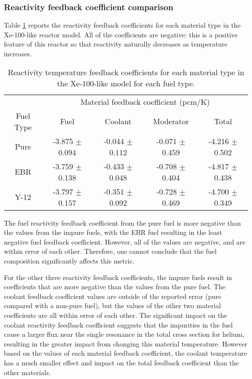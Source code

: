 \subsubsection{Reactivity feedback coefficient comparison}
Table \ref{tab:coeff_xe100} reports the reactivity feedback 
coefficients for each material type in the Xe-100-like reactor model. 
All of the coefficients are negative: this is a positive feature of 
this reactor so that reactivity naturally decreases as temperature 
increases. 

\begin{table}[ht]
        \centering
        \caption{Reactivity temperature feedback coefficients for 
        each material type in the Xe-100-like model for each fuel 
        type.}
        \label{tab:coeff_xe100}
        \begin{tabular}{c c c c c}
            \hline 
            & \multicolumn{4}{c}{Material feedback coefficient (pcm/K)} \\
            Fuel Type & Fuel & Coolant & Moderator & Total \\
            \hline
            Pure & -3.875 $\pm$ 0.094 & -0.044 $\pm$ 0.112 & -0.071 $\pm$ 0.459 & -4.216 $\pm$ 0.502\\
            \gls{EBR} & -3.759 $\pm$ 0.138 & -0.433 $\pm$ 0.048 & -0.708 $\pm$ 0.404 & -4.817 $\pm$ 0.438\\
            Y-12 & -3.797 $\pm$ 0.157 & -0.351 $\pm$ 0.092 & -0.728 $\pm$ 0.469 & -4.700 $\pm$ 0.349\\
            \hline

        \end{tabular}
\end{table}

The fuel reactivity feedback coefficient from the pure fuel is more 
negative than the values from the impure fuels, with the \gls{EBR} fuel 
resulting in the least negative fuel feedback coefficient. However, all of 
the values are negative, and are within error of each other. Therefore, 
one cannot conclude that the fuel composition significantly affects this 
metric. 

For the other three reactivity feedback coefficients, the impure fuels 
result in coefficients that are more negative than the values from 
the pure fuel. The coolant feedback coefficient values are outside 
of the reported error (pure compared with a non-pure fuel), but the 
values of the other two material coefficients are all within error of 
each other. The significant impact on the coolant reactivity feedback 
coefficient suggests that the impurities in the fuel cause a larger 
flux near the single resonance in the total cross section for helium,
resulting in the greater impact from changing this material temperature. 
However based on the values of each material feedback coefficient, 
the coolant temperature has a much smaller effect and impact on the 
total feedback coefficient than the other materials. 

